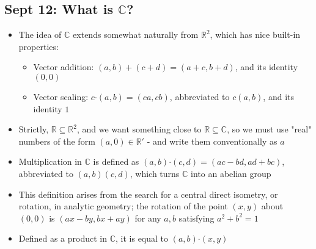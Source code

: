 \documentclass[10pt, oneside]{article}
\newcommand{\R}{\mathbb{R}}
\newcommand{\C}{\mathbb{C}}
\newcommand{\Cdot}{\boldsymbol{\cdot}}
\begin{document}
\subsection{Sept 12: What is $\C$?}
\begin{itemize}
    \item The idea of $\C$ extends somewhat naturally from $\R ^ 2$, which has nice built-in properties:
    \begin{itemize}
        \item Vector addition: $(a,b)+(c+d)=(a+c,b+d)$, and its identity $(0,0)$
        \item Vector scaling: $c \Cdot (a,b)=(ca,cb)$, abbreviated to $c(a,b)$, and its identity $1$
    \end{itemize}
    \item Strictly, $\R \subseteq \R ^ 2$, and we want something close to $\R \subseteq \C$, so we must use "real" numbers of the form $(a,0) \in \R'$ - and write them conventionally as $a$
    \item Multiplication in $\C$ is defined as $(a,b) \Cdot (c,d)=(ac-bd,ad+bc)$, abbreviated to $(a,b)(c,d)$, which turns $\C$ into an abelian group
    \item This definition arises from the search for a central direct isometry, or rotation, in analytic geometry; the rotation of the point $(x,y)$ about $(0,0)$ is $(ax-by,bx+ay)$ for any $a,b$ satisfying $a^2+b^2=1$
    \item Defined as a product in $\C$, it is equal to $(a,b) \Cdot (x,y)$
\end{itemize}
\end{document}
